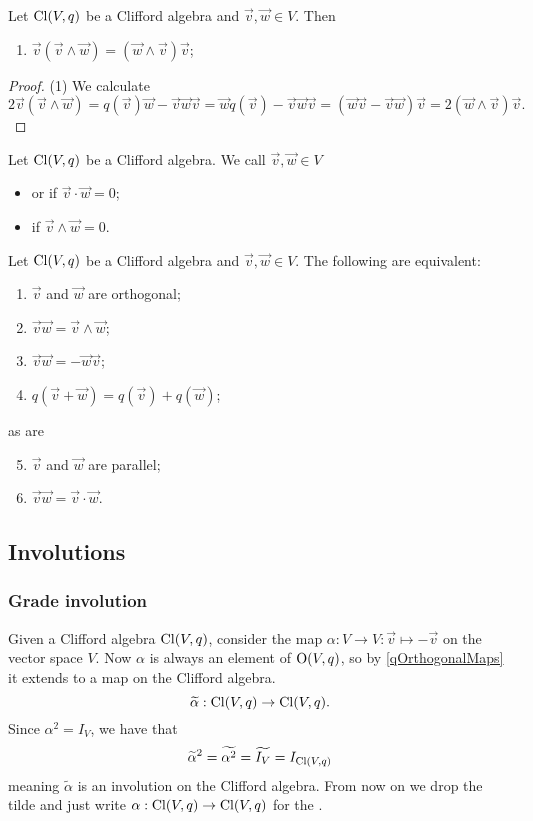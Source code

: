 \begin{lemma} \label{CliffordIdentities}
Let $\operatorname{Cl}(V,q)$ be a Clifford algebra and $\vec{v},\vec{w}\in V$.
Then
\begin{enumerate}
\item $\vec{v}(\vec{v}\wedge \vec{w}) = (\vec{w}\wedge \vec{v})\vec{v}$;
\end{enumerate}
\end{lemma}
\begin{proof}
(1) We calculate
\[ 2\vec{v}(\vec{v}\wedge \vec{w}) = q(\vec{v})\vec{w} - \vec{v}\vec{w}\vec{v} = \vec{w}q(\vec{v}) - \vec{v}\vec{w}\vec{v} = (\vec{w}\vec{v} - \vec{v}\vec{w})\vec{v} = 2(\vec{w}\wedge \vec{v})\vec{v}. \]
\end{proof}

\begin{definition}
Let $\operatorname{Cl}(V,q)$ be a Clifford algebra. We call $\vec{v},\vec{w}\in V$
\begin{itemize}
\item {} or  if $\vec{v}\cdot \vec{w} = 0$;
\item {} if $\vec{v}\wedge \vec{w} = 0$.
\end{itemize}
\end{definition}
\begin{lemma}
Let $\operatorname{Cl}(V,q)$ be a Clifford algebra and $\vec{v},\vec{w}\in V$. The following are equivalent:
\begin{enumerate}
\item $\vec{v}$ and $\vec{w}$ are orthogonal;
\item $\vec{v}\vec{w} = \vec{v}\wedge \vec{w}$;
\item $\vec{v}\vec{w} = -\vec{w}\vec{v}$;
\item $q(\vec{v}+\vec{w}) = q(\vec{v})+ q(\vec{w})$;
\end{enumerate}
as are
\begin{enumerate} \setcounter{enumi}{4}
\item $\vec{v}$ and $\vec{w}$ are parallel;
\item $\vec{v}\vec{w} = \vec{v}\cdot \vec{w}$.
\end{enumerate}
\end{lemma}


\subsection{Involutions}
\subsubsection{Grade involution}
Given a Clifford algebra $\operatorname{Cl}(V,q)$, consider the map $\alpha: V \to V: \vec{v}\mapsto -\vec{v}$ on the vector space $V$.
Now $\alpha$ is always an element of $\operatorname{O}(V,q)$, so by \ref{qOrthogonalMaps} it extends to a map on the Clifford algebra.
\[ \widetilde{\alpha}: \operatorname{Cl}(V,q) \to \operatorname{Cl}(V,q). \]
Since $\alpha^2 = I_V$, we have that
\[ \widetilde{\alpha}^2 = \widetilde{\alpha^2} = \widetilde{I_V} = I_{\operatorname{Cl}(V,q)} \]
meaning $\widetilde{\alpha}$ is an involution on the Clifford algebra. From now on we drop the tilde and just write $\alpha: \operatorname{Cl}(V,q) \to \operatorname{Cl}(V,q)$ for the .

